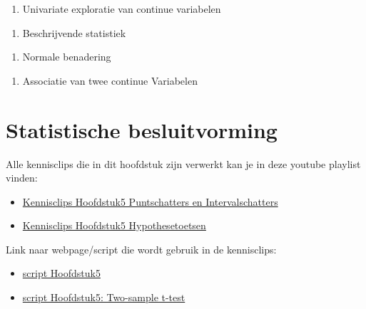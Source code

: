 \documentclass[
  12pt,dutch,coursenotes]{book}
\providecommand{\tightlist}{%
  \setlength{\itemsep}{0pt}\setlength{\parskip}{0pt}}
\theoremstyle{definition}
\theoremstyle{definition}
\theoremstyle{definition}
\theoremstyle{definition}
\theoremstyle{remark}
\begin{document}
\begin{enumerate}
\def\labelenumi{\arabic{enumi}.}
\tightlist
\item
  Univariate exploratie van continue variabelen
\end{enumerate}

\begin{enumerate}
\def\labelenumi{\arabic{enumi}.}
\setcounter{enumi}{1}
\tightlist
\item
  Beschrijvende statistiek
\end{enumerate}

\begin{enumerate}
\def\labelenumi{\arabic{enumi}.}
\setcounter{enumi}{2}
\tightlist
\item
  Normale benadering
\end{enumerate}

\begin{enumerate}
\def\labelenumi{\arabic{enumi}.}
\setcounter{enumi}{3}
\tightlist
\item
  Associatie van twee continue Variabelen
\end{enumerate}

\hypertarget{chap-besluit}{%
\chapter{Statistische besluitvorming}\label{chap-besluit}}

Alle kennisclips die in dit hoofdstuk zijn verwerkt kan je in deze youtube playlist vinden:

\begin{itemize}
\item
  \href{https://www.youtube.com/playlist?list=PLZH1hP8_LbJKyD9Jw5cqd-btYs11f9tkz}{Kennisclips Hoofdstuk5 Puntschatters en Intervalschatters}
\item
  \href{https://www.youtube.com/playlist?list=PLZH1hP8_LbJKEtDy2errIWf8hLJODw-jK}{Kennisclips Hoofdstuk5 Hypothesetoetsen}
\end{itemize}

Link naar webpage/script die wordt gebruik in de kennisclips:

\begin{itemize}
\item
  \href{https://statomics.github.io/sbc21/rmd/05-statisticalInference.html}{script Hoofdstuk5}
\item
  \href{https://statomics.github.io/sbc21/rmd/05-statisticalInference-twosampleT.html}{script Hoofdstuk5: Two-sample t-test}
\end{itemize}
\end{document}
